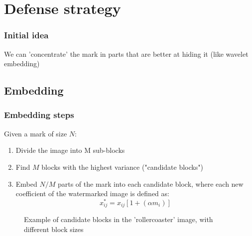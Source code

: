 \section{Defense strategy}
\begin{frame}
    \frametitle{Initial idea}
    We can 'concentrate' the mark in parts that are better at hiding it (like wavelet embedding)
\end{frame}

\subsection{Embedding}
\begin{frame}
    \frametitle{Embedding steps}
    Given a mark of size $N$:
    \begin{enumerate}
        \item<1-> Divide the image into M sub-blocks
        \item<2-> Find $M$ blocks with the highest variance ("candidate blocks")
        \item<3-> Embed $N/M$ parts of the mark into each candidate block, where each new coefficient of the watermarked image is defined as: %
              \[x_{ij}^* = x_{ij}[1 + (\alpha m_i)]\]
    \end{enumerate}

    \begin{figure}[h]
        \centering
         \quad
         \quad
        \caption{Example of candidate blocks in the 'rollercoaster' image, with different block sizes}
        \label{fig:blocks_rollecoaster}
    \end{figure}
\end{frame}

